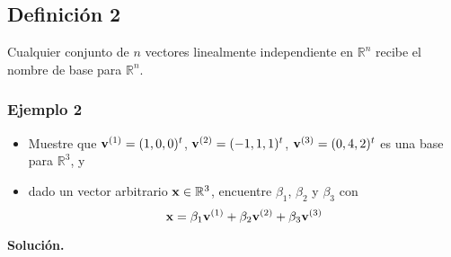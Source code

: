 \documentclass[12pt, a4paper]{article}
\numberwithin{subsection}{section} %
\begin{document}
        \subsection{\textnormal{Definición 2}}
        
        Cualquier conjunto de $n$ vectores linealmente independiente en $\mathbb{R}^{n}$ recibe el nombre de base para $\mathbb{R}^{n}$.
        
        \subsubsection*{Ejemplo 2}
        
        \begin{itemize}
            \item Muestre que ${\bf v}^{(1)} = (1,0,0)^t$, ${\bf v}^{(2)} = (-1,1,1)^t$, ${\bf v}^{(3)} = (0,4,2)^t$ es una base para $\mathbb{R}^3$, y
            \item dado un vector arbitrario ${\bf x} \in \mathbb{R}^3$, encuentre $\beta_1$, $\beta_2$ y $\beta_3$ con
            $${\bf x} = \beta_1{\bf v}^{(1)} + \beta_2{\bf v}^{(2)} + \beta_3{\bf v}^{(3)}$$
        \end{itemize}
        
        {\bf Solución.}
        
\end{document}
